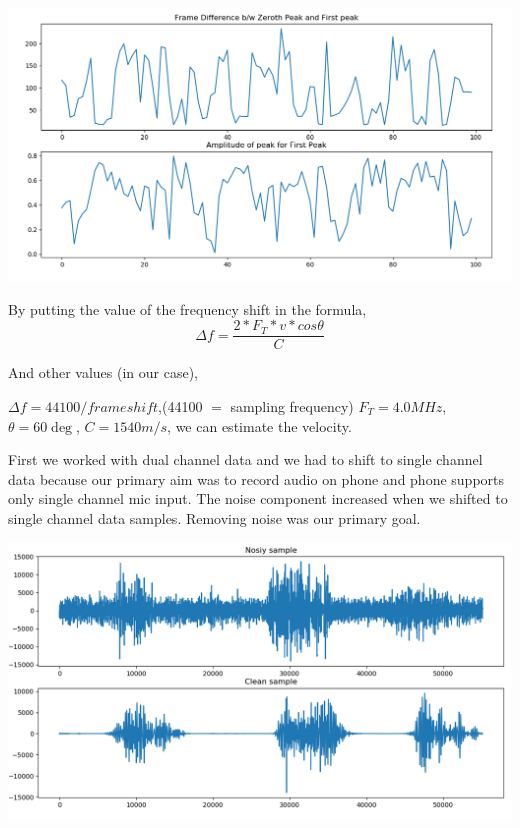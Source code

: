 \documentclass[BTech]{nitkdiss}
\begin{document}
\begin{center}
\includegraphics[scale = 0.33]{auto2.png}
\end{center}

\hspace{0.4cm} By putting the value of the frequency shift in the formula,\\

\begin{equation}
\Delta f = \frac{2 * F_T * v * cos \theta}{C}
\end{equation}


And other values (in our case),

$\Delta f = 44100 / frame shift$,(44100 $=$ sampling frequency)
$F_T = 4.0 MHz$,
$\theta = 60\deg$,
$C = 1540 m/s$, we can estimate the velocity. 


\hspace{0.4cm} First we worked with dual channel data and we had to shift to single channel data because our primary aim was to record audio on phone and phone supports only single channel mic input. The noise component increased when we shifted to single channel data samples. Removing noise was our primary goal.\\

\begin{center}
\includegraphics[scale = 0.4]{clean_noisy.png}
\end{center}
\end{document}
